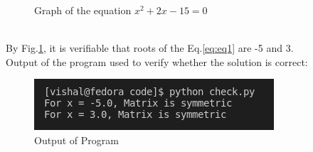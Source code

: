 \documentclass[journal,12pt,twocolumn]{IEEEtran}
\begin{document}
\begin{enumerate}[label=]
\begin{figure}[h]
	\caption{Graph of the equation $x^2 + 2x - 15 = 0$}
	\label{fig1}
	\end{figure}\\
	By Fig.\ref{fig1}, it is verifiable that roots of the Eq.\ref{eq:eq1} are -5 and 3. \\
	Output of the program used to verify whether the solution is correct:
	\begin{figure}[h]
	\includegraphics[width=\columnwidth]{./figs/Output.png}
	\caption{Output of Program}
	\label{fig2}
	\end{figure}
\end{enumerate}
\end{document}
